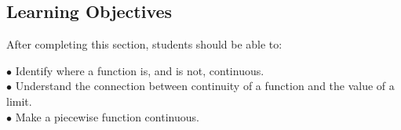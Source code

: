 \documentclass{ximera}
\begin{document}
\subsection{Learning Objectives}
After completing this section, students should be able to:
\vspace{.05in}

\noindent$\bullet$ Identify where a function is, and is not, continuous.
\\$\bullet$ Understand the connection between continuity of a function and the value of a limit.
\\$\bullet$ Make a piecewise function continuous.

\end{document}
